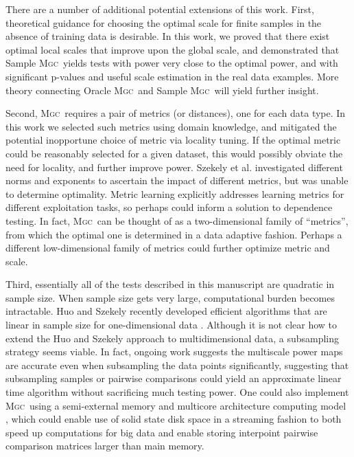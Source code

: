 \documentclass[11pt]{article}
\providecommand{\sct}[1]{{\normalfont\textsc{#1}}}
\newcommand{\Mgc}{\sct{Mgc}}
\begin{document}
There are a number of additional potential extensions of this work. First, theoretical guidance for choosing the optimal scale for finite samples in the absence of training data is desirable. 
In this work, we proved that there exist optimal local scales that improve upon the global scale, and demonstrated that Sample \Mgc~yields tests with power very close to the optimal power,  and with significant p-values and useful scale estimation in the real data examples. More theory connecting Oracle \Mgc~and  Sample \Mgc~will yield further insight.

Second, \Mgc~requires a pair of metrics (or distances), one for each data type. In this work we selected such metrics using domain knowledge, and mitigated the potential inopportune choice of metric via locality tuning.  If the optimal metric could be reasonably selected for a given dataset, this would possibly obviate the need for locality, and further improve power. Szekely et al. investigated different norms and exponents to ascertain the impact of different metrics, but was unable to determine optimality.
Metric learning \cite{xing2003distance} explicitly addresses learning metrics for different exploitation tasks, so perhaps could inform a solution to dependence testing.
In fact, \Mgc~can be thought of as a two-dimensional family of ``metrics'', from which the optimal one is determined in a data adaptive fashion.  Perhaps a different low-dimensional family of metrics could further optimize metric and scale.

Third, essentially all of the tests described in this manuscript are quadratic in sample size.  When sample size gets very large, computational burden becomes intractable. Huo and Szekely  recently developed efficient algorithms that are linear in sample size for one-dimensional data \cite{Huo2016}.  Although it is not clear how to extend the Huo and Szekely approach to multidimensional data, a subsampling strategy seems viable. In fact, ongoing work suggests the multiscale power maps are accurate even when subsampling the data points significantly, suggesting that subsampling samples or pairwise comparisons could yield an approximate linear time algorithm without sacrificing much testing power.  One could also implement \Mgc~using a semi-external memory and multicore architecture computing model \cite{Zheng2016},  which could enable use of solid state disk space in a streaming fashion to both speed up computations for big data and enable storing interpoint pairwise comparison matrices larger than main memory.
\end{document}

